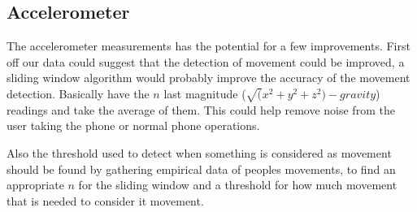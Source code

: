 \subsection{Accelerometer}
The accelerometer measurements has the potential for a few improvements. First off our data could suggest that the detection of movement could be improved, a sliding window algorithm would probably improve the accuracy of the movement detection. Basically have the $n$ last magnitude ($\sqrt(x^2+y^2+z^2)-gravity$) readings and take the average of them. This could help remove noise from the user taking the phone or normal phone operations.

Also the threshold used to detect when something is considered as movement should be found by gathering empirical data of peoples movements, to find an appropriate $n$ for the sliding window and a threshold for how much movement that is needed to consider it movement.